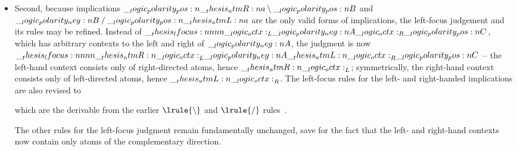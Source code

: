 \begin{itemize}
\item
Second, because implications $\__logic_polarity_pos:n {\__thesis_atmR:n {a}} \mathbin { \setminus } \__logic_polarity_pos:n {B}$ and $\__logic_polarity_neg:n {B} \mathbin { / } \__logic_polarity_pos:n {\__thesis_atmL:n {a}}$ are the only valid forms of implications, the left-focus judgement and its rules may be refined.
Instead of $\__thesis_lfocus:nnnn {\__logic_octx:_L} {\__logic_polarity_neg:n {A}} {\__logic_octx:_R} {\__logic_polarity_pos:n {C}}$, which has arbitrary contexts to the left and right of $\__logic_polarity_neg:n {A}$, the judgment is now $\__thesis_lfocus:nnnn {\__thesis_atmR:n {\__logic_octx:}_L} {\__logic_polarity_neg:n {A}} {\__thesis_atmL:n {\__logic_octx:}_R} {\__logic_polarity_pos:n {C}}$ -- the left-hand context consists only of right-directed atoms, hence $\__thesis_atmR:n {\__logic_octx:}_L$; symmetrically, the right-hand context consists only of left-directed atoms, hence $\__thesis_atmL:n {\__logic_octx:}_R$.
The left-focus rules for the left- and right-handed implications are also revised to
which are the derivable from the earlier $\lrule{\limp}$ and $\lrule{\pmir}$ rules~.

The other rules for the left-focus judgment remain fundamentally unchanged, save for the fact that the left- and right-hand contexts now contain only atoms of the complementary direction.
\end{itemize}
